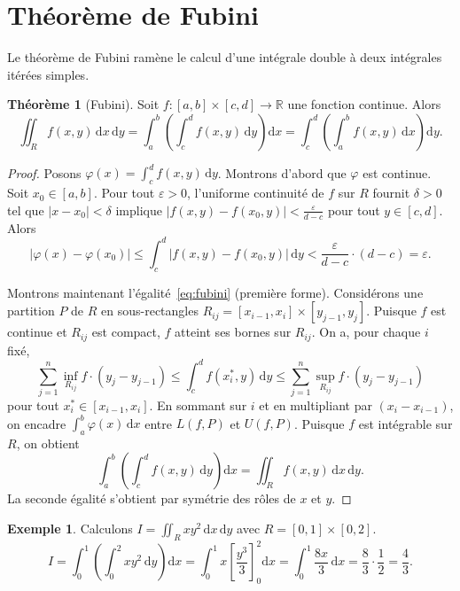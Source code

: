 \documentclass[12pt,a4paper,openany]{book}
\theoremstyle{definition}
\newtheorem{theoreme}{Théorème}[chapter]
\newtheorem{exemple}{Exemple}[chapter]
\newcommand{\R}{\mathbb{R}}
\newcommand{\eps}{\varepsilon}
\newcommand{\abs}[1]{\left\lvert #1 \right\rvert}
\newcommand{\dd}{\mathrm{d}}
\begin{document}
\section{Théorème de Fubini}
\label{sec:fubini}


Le théorème de Fubini ramène le calcul d'une intégrale double à deux
intégrales itérées simples.

\begin{theoreme}[Fubini]\label{thm:fubini}
  Soit $f\colon [a,b]\times[c,d] \to \R$ une fonction continue. Alors
  \begin{equation}\label{eq:fubini}
    \iint_R f(x,y)\,\dd x\,\dd y
    = \int_a^b \!\left(\int_c^d f(x,y)\,\dd y\right)\dd x
    = \int_c^d \!\left(\int_a^b f(x,y)\,\dd x\right)\dd y.
  \end{equation}
\end{theoreme}

\begin{proof}
  Posons $\varphi(x) = \int_c^d f(x,y)\,\dd y$. Montrons d'abord que
  $\varphi$ est continue. Soit $x_0 \in [a,b]$. Pour tout $\eps > 0$,
  l'uniforme continuité de $f$ sur $R$ fournit $\delta > 0$ tel que
  $\abs{x - x_0} < \delta$ implique $\abs{f(x,y) - f(x_0,y)} <
  \frac{\eps}{d-c}$ pour tout $y \in [c,d]$. Alors
  \[
    \abs{\varphi(x) - \varphi(x_0)}
    \leqslant \int_c^d \abs{f(x,y) - f(x_0,y)}\,\dd y
    < \frac{\eps}{d-c}\cdot(d-c) = \eps.
  \]

  Montrons maintenant l'égalité~\eqref{eq:fubini} (première forme).
  Considérons une partition $P$ de $R$ en sous-rectangles
  $R_{ij} = [x_{i-1},x_i]\times[y_{j-1},y_j]$. Puisque $f$ est
  continue et $R_{ij}$ est compact, $f$ atteint ses bornes sur
  $R_{ij}$. On a, pour chaque $i$ fixé,
  \[
    \sum_{j=1}^n \inf_{R_{ij}} f \cdot (y_j - y_{j-1})
    \leqslant \int_c^d f(x_i^*, y)\,\dd y
    \leqslant \sum_{j=1}^n \sup_{R_{ij}} f \cdot (y_j - y_{j-1})
  \]
  pour tout $x_i^* \in [x_{i-1}, x_i]$. En sommant sur $i$ et en
  multipliant par $(x_i - x_{i-1})$, on encadre
  $\int_a^b \varphi(x)\,\dd x$ entre $L(f,P)$ et $U(f,P)$. Puisque
  $f$ est intégrable sur $R$, on obtient
  \[
    \int_a^b\!\left(\int_c^d f(x,y)\,\dd y\right)\dd x
    = \iint_R f(x,y)\,\dd x\,\dd y.
  \]
  La seconde égalité s'obtient par symétrie des rôles de $x$ et $y$.
\end{proof}

\begin{exemple}\label{ex:fubini-calcul}
  Calculons $\displaystyle I = \iint_R xy^2\,\dd x\,\dd y$ avec
  $R = [0,1]\times[0,2]$.
  \[
    I = \int_0^1\!\left(\int_0^2 xy^2\,\dd y\right)\dd x
    = \int_0^1 x\left[\frac{y^3}{3}\right]_0^2 \dd x
    = \int_0^1 \frac{8x}{3}\,\dd x
    = \frac{8}{3}\cdot\frac{1}{2} = \frac{4}{3}.
  \]
\end{exemple}
\end{document}
